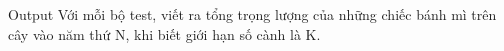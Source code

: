 Output
Với mỗi bộ test, viết ra tổng trọng lượng của những chiếc bánh mì trên cây vào năm thứ N, khi biết giới hạn số cành là K.